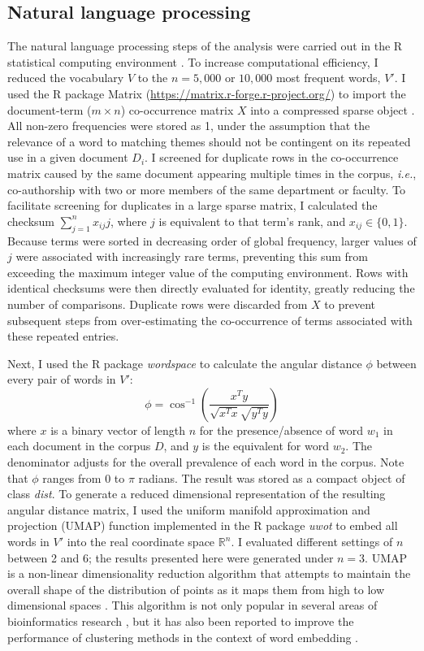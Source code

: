 \documentclass[12pt]{article}
\begin{document}
\subsection * {Natural language processing}

The natural language processing steps of the analysis were carried out in the R statistical computing environment \citep{rcore2023r}.
To increase computational efficiency, I reduced the vocabulary $V$ to the $n=5,000$ or $10,000$ most frequent words, $V'$.
I used the R package Matrix (\url{https://matrix.r-forge.r-project.org/}) to import the document-term ($m\times n$) co-occurrence matrix $X$ into a compressed sparse object \citep{bates2023matrix}.
All non-zero frequencies were stored as 1, under the assumption that the relevance of a word to matching themes should not be contingent on its repeated use in a given document $D_i$.
I screened for duplicate rows in the co-occurrence matrix caused by the same document appearing multiple times in the corpus, \textit{i.e.}, co-authorship with two or more members of the same department or faculty.
To facilitate screening for duplicates in a large sparse matrix, I calculated the checksum $\sum_{j=1}^{n} x_{ij}j$, where $j$ is equivalent to that term's rank, and $x_{ij}\in\{0,1\}$.
Because terms were sorted in decreasing order of global frequency, larger values of $j$ were associated with increasingly rare terms, preventing this sum from exceeding the maximum integer value of the computing environment.
Rows with identical checksums were then directly evaluated for identity, greatly reducing the number of comparisons.
Duplicate rows were discarded from $X$ to prevent subsequent steps from over-estimating the co-occurrence of terms associated with these repeated entries.


Next, I used the R package \textit{wordspace} \citep{evert2014distributional} to calculate the angular distance $\phi$ between every pair of words in $V'$:
\[
\phi = \cos^{-1} \left( \frac{x^T y}{\sqrt{x^T x} \sqrt{y^T y}} \right)
\]
where $x$ is a binary vector of length $n$ for the presence/absence of word $w_1$ in each document in the corpus $D$, and $y$ is the equivalent for word $w_2$.
The denominator adjusts for the overall prevalence of each word in the corpus.
Note that $\phi$ ranges from 0 to $\pi$ radians.
The result was stored as a compact object of class \textit{dist}.
To generate a reduced dimensional representation of the resulting angular distance matrix, I used the uniform manifold approximation and projection (UMAP) function implemented in the R package \textit{uwot} \citep{melville2024uwot} to embed all words in $V'$ into the real coordinate space $\mathbb{R}^n$.
I evaluated different settings of $n$ between 2 and 6; the results presented here were generated under $n=3$.
UMAP is a non-linear dimensionality reduction algorithm that attempts to maintain the overall shape of the distribution of points as it maps them from high to low dimensional spaces \citep{mcinnes2018umap}.
This algorithm is not only popular in several areas of bioinformatics research \citep[\textit{e.g.},][]{yang2021dimensionality}, but it has also been reported to improve the performance of clustering methods in the context of word embedding \citep{asyaky2021improving}.
\end{document}
